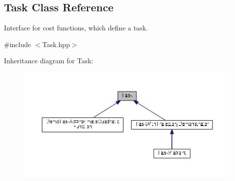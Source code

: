 \hypertarget{classDmpBbo_1_1Task}{\subsection{Task Class Reference}
\label{classDmpBbo_1_1Task}
}


Interface for cost functions, which define a task.  




{\ttfamily \#include $<$Task.\+hpp$>$}



Inheritance diagram for Task\+:
\nopagebreak
\begin{figure}[H]
\begin{center}
\leavevmode
\includegraphics[width=350pt]{classDmpBbo_1_1Task__inherit__graph}
\end{center}
\end{figure}

